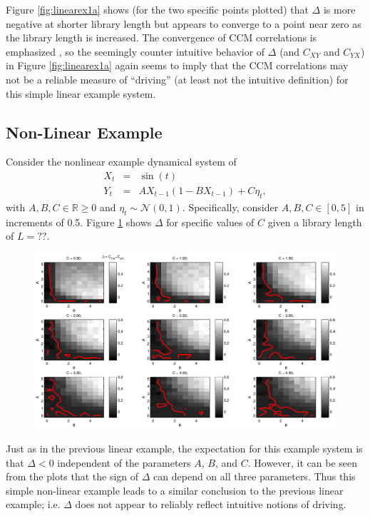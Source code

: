 \documentclass[a4paper,11pt]{article}
\begin{document}
Figure \ref{fig:linearex1a} shows (for the two specific points plotted) that $\Delta$ is more negative at shorter library length but appears to converge to a point near zero as the library length is increased.  The convergence of CCM correlations is emphasized \cite{Sugihara2012}, so the seemingly counter intuitive behavior of $\Delta$ (and $C_{XY}$ and $C_{YX}$) in Figure \ref{fig:linearex1a} again seems to imply that the CCM correlations may not be a reliable measure of ``driving'' (at least not the intuitive definition) for this simple linear example system.

\subsection{Non-Linear Example}
Consider the nonlinear example dynamical system of
\begin{eqnarray}
X_t &=& \sin(t)\\
Y_t &=& AX_{t-1}\left(1-BX_{t-1}\right)+C\eta_t,
\end{eqnarray}
with $A,B,C\in\mathbb{R}\ge 0$ and $\eta_t\sim\mathcal{N}\left(0,1\right)$.  Specifically, consider $A,B,C\in[0,5]$ in increments of 0.5.  Figure \ref{fig:nonlinearex} shows $\Delta$ for specific values of $C$ given a library length of $L=??$.
\begin{figure}[ht]
\includegraphics[scale=0.55]{RLCircuitPlots/NonLinearEx.eps} \\
\caption{}
\label{fig:nonlinearex}
\end{figure}
Just as in the previous linear example, the expectation for this example system is that $\Delta<0$ independent of the parameters $A$, $B$, and $C$.  However, it can be seen from the plots that the sign of $\Delta$ can depend on all three parameters.  Thus this simple non-linear example leads to a similar conclusion to the previous linear example; i.e. $\Delta$ does not appear to reliably reflect intuitive notions of driving.
\end{document}
